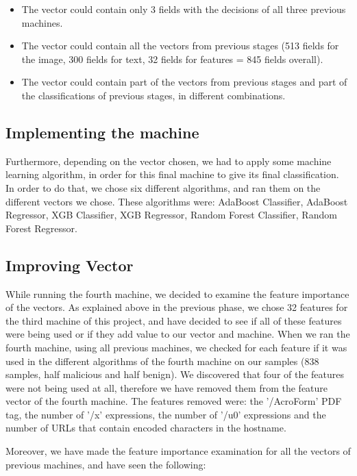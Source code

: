 \documentclass{article}
\begin{document}
\renewcommand{\labelitemi}{$\textendash$}
\begin{itemize}
    \item  The vector could contain only 3 fields with the decisions of all three previous machines.
    \item The vector could contain all the vectors from previous stages (513 fields for the image, 300 fields for text, 32 fields for features = 845 fields overall).
	\item The vector could contain part of the vectors from previous stages and part of the classifications of previous stages, in different combinations.
\end{itemize}

\subsection{Implementing the machine}
\indent Furthermore, depending on the vector chosen, we had to apply some machine learning algorithm, in order for this final machine to give its final classification. In order to do that, we chose six different algorithms, and ran them on the different vectors we chose. These algorithms were: AdaBoost Classifier, AdaBoost Regressor, XGB Classifier, XGB Regressor, Random Forest Classifier, Random Forest Regressor.

\subsection{Improving Vector}
\indent While running the fourth machine, we decided to examine the feature importance of the vectors. As explained above in the previous phase, we chose 32 features for the third machine of this project, and have decided to see if all of these features were being used or if they add value to our vector and machine. When we ran the fourth machine, using all previous machines, we checked for each feature if it was used in the different algorithms of the fourth machine on our samples (838 samples, half malicious and half benign). We discovered that four of the features were not being used at all, therefore we have removed them from the feature vector of the fourth machine. The features removed were: the '/AcroForm' PDF tag, the number of '/x' expressions, the number of '/u0' expressions and the number of URLs that contain encoded characters in the hostname.

\indent	Moreover, we have made the feature importance examination for all the vectors of previous machines, and have seen the following: 
\end{document}
